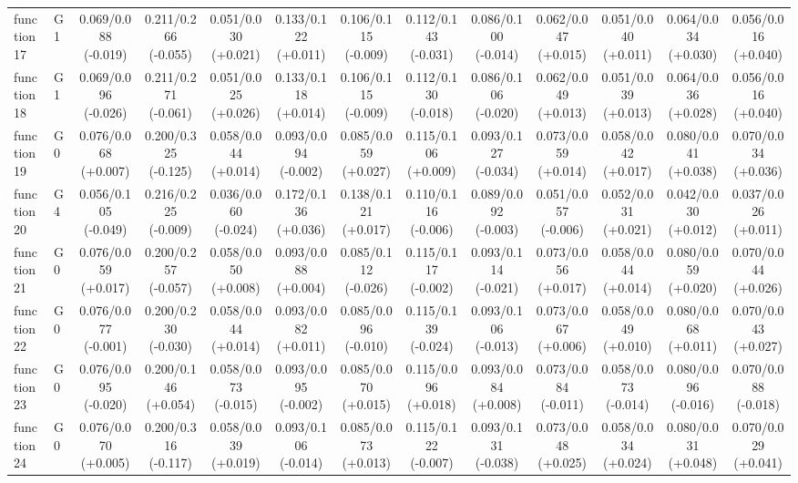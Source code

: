 \begin{table}[htbp]
\begin{adjustbox}{max width=\textwidth}
\begin{tabular}{llccccccccccc}
function17 & G1 & 0.069/0.088 (-0.019) & 0.211/0.266 (-0.055) & 0.051/0.030 (+0.021) & 0.133/0.122 (+0.011) & 0.106/0.115 (-0.009) & 0.112/0.143 (-0.031) & 0.086/0.100 (-0.014) & 0.062/0.047 (+0.015) & 0.051/0.040 (+0.011) & 0.064/0.034 (+0.030) & 0.056/0.016 (+0.040) \\
function18 & G1 & 0.069/0.096 (-0.026) & 0.211/0.271 (-0.061) & 0.051/0.025 (+0.026) & 0.133/0.118 (+0.014) & 0.106/0.115 (-0.009) & 0.112/0.130 (-0.018) & 0.086/0.106 (-0.020) & 0.062/0.049 (+0.013) & 0.051/0.039 (+0.013) & 0.064/0.036 (+0.028) & 0.056/0.016 (+0.040) \\
function19 & G0 & 0.076/0.068 (+0.007) & 0.200/0.325 (-0.125) & 0.058/0.044 (+0.014) & 0.093/0.094 (-0.002) & 0.085/0.059 (+0.027) & 0.115/0.106 (+0.009) & 0.093/0.127 (-0.034) & 0.073/0.059 (+0.014) & 0.058/0.042 (+0.017) & 0.080/0.041 (+0.038) & 0.070/0.034 (+0.036) \\
function20 & G4 & 0.056/0.105 (-0.049) & 0.216/0.225 (-0.009) & 0.036/0.060 (-0.024) & 0.172/0.136 (+0.036) & 0.138/0.121 (+0.017) & 0.110/0.116 (-0.006) & 0.089/0.092 (-0.003) & 0.051/0.057 (-0.006) & 0.052/0.031 (+0.021) & 0.042/0.030 (+0.012) & 0.037/0.026 (+0.011) \\
function21 & G0 & 0.076/0.059 (+0.017) & 0.200/0.257 (-0.057) & 0.058/0.050 (+0.008) & 0.093/0.088 (+0.004) & 0.085/0.112 (-0.026) & 0.115/0.117 (-0.002) & 0.093/0.114 (-0.021) & 0.073/0.056 (+0.017) & 0.058/0.044 (+0.014) & 0.080/0.059 (+0.020) & 0.070/0.044 (+0.026) \\
function22 & G0 & 0.076/0.077 (-0.001) & 0.200/0.230 (-0.030) & 0.058/0.044 (+0.014) & 0.093/0.082 (+0.011) & 0.085/0.096 (-0.010) & 0.115/0.139 (-0.024) & 0.093/0.106 (-0.013) & 0.073/0.067 (+0.006) & 0.058/0.049 (+0.010) & 0.080/0.068 (+0.011) & 0.070/0.043 (+0.027) \\
function23 & G0 & 0.076/0.095 (-0.020) & 0.200/0.146 (+0.054) & 0.058/0.073 (-0.015) & 0.093/0.095 (-0.002) & 0.085/0.070 (+0.015) & 0.115/0.096 (+0.018) & 0.093/0.084 (+0.008) & 0.073/0.084 (-0.011) & 0.058/0.073 (-0.014) & 0.080/0.096 (-0.016) & 0.070/0.088 (-0.018) \\
function24 & G0 & 0.076/0.070 (+0.005) & 0.200/0.316 (-0.117) & 0.058/0.039 (+0.019) & 0.093/0.106 (-0.014) & 0.085/0.073 (+0.013) & 0.115/0.122 (-0.007) & 0.093/0.131 (-0.038) & 0.073/0.048 (+0.025) & 0.058/0.034 (+0.024) & 0.080/0.031 (+0.048) & 0.070/0.029 (+0.041) \\
\bottomrule
\end{tabular}
\end{adjustbox}
\end{table}
